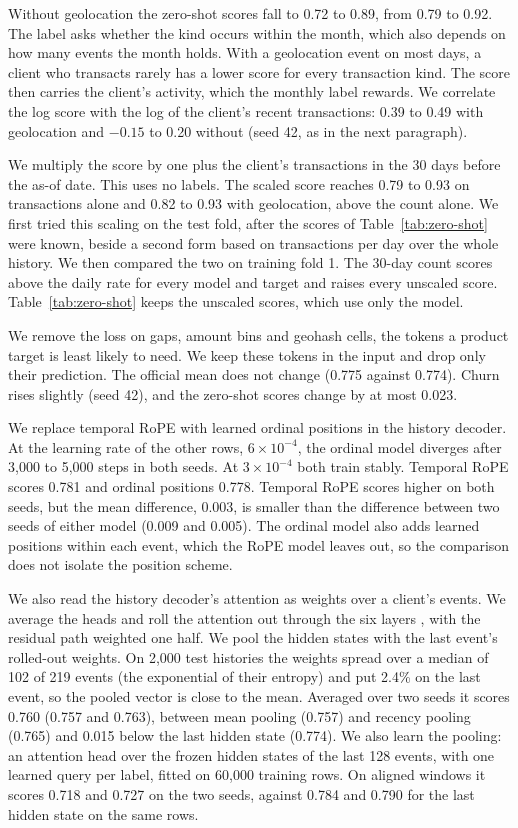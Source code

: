 \documentclass[12pt]{article}
\begin{document}
Without geolocation the zero-shot scores fall to 0.72 to 0.89, from 0.79 to 0.92. The label asks whether the kind occurs within the month, which also depends on how many events the month holds. With a geolocation event on most days, a client who transacts rarely has a lower score for every transaction kind. The score then carries the client's activity, which the monthly label rewards. We correlate the log score with the log of the client's recent transactions: 0.39 to 0.49 with geolocation and $-0.15$ to 0.20 without (seed 42, as in the next paragraph).

We multiply the score by one plus the client's transactions in the 30 days before the as-of date. This uses no labels. The scaled score reaches 0.79 to 0.93 on transactions alone and 0.82 to 0.93 with geolocation, above the count alone. We first tried this scaling on the test fold, after the scores of Table~\ref{tab:zero-shot} were known, beside a second form based on transactions per day over the whole history. We then compared the two on training fold 1. The 30-day count scores above the daily rate for every model and target and raises every unscaled score. Table~\ref{tab:zero-shot} keeps the unscaled scores, which use only the model.

We remove the loss on gaps, amount bins and geohash cells, the tokens a product target is least likely to need. We keep these tokens in the input and drop only their prediction. The official mean does not change (0.775 against 0.774). Churn rises slightly (seed 42), and the zero-shot scores change by at most 0.023.

We replace temporal RoPE with learned ordinal positions in the history decoder. At the learning rate of the other rows, $6\times10^{-4}$, the ordinal model diverges after 3,000 to 5,000 steps in both seeds. At $3\times10^{-4}$ both train stably. Temporal RoPE scores 0.781 and ordinal positions 0.778. Temporal RoPE scores higher on both seeds, but the mean difference, 0.003, is smaller than the difference between two seeds of either model (0.009 and 0.005). The ordinal model also adds learned positions within each event, which the RoPE model leaves out, so the comparison does not isolate the position scheme.

We also read the history decoder's attention as weights over a client's events. We average the heads and roll the attention out through the six layers \cite{rollout}, with the residual path weighted one half. We pool the hidden states with the last event's rolled-out weights. On 2,000 test histories the weights spread over a median of 102 of 219 events (the exponential of their entropy) and put 2.4\% on the last event, so the pooled vector is close to the mean. Averaged over two seeds it scores 0.760 (0.757 and 0.763), between mean pooling (0.757) and recency pooling (0.765) and 0.015 below the last hidden state (0.774). We also learn the pooling: an attention head over the frozen hidden states of the last 128 events, with one learned query per label, fitted on 60,000 training rows. On aligned windows it scores 0.718 and 0.727 on the two seeds, against 0.784 and 0.790 for the last hidden state on the same rows.
\end{document}
